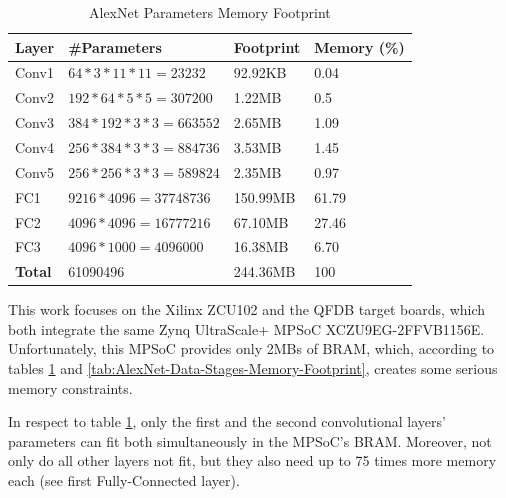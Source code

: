 \begin{table}[H]
	\caption{AlexNet Parameters Memory Footprint}
	\label{tab:AlexNet-Parameters-Memory-Footprint}
	\centering
	\begin{tabular}{llll}
		\toprule
		\textbf{Layer} & \textbf{\#Parameters} & \textbf{Footprint} & \textbf{Memory (\%)}  \\
		\midrule
			Conv1 & $64 * 3 * 11 * 11 = 23232$ & 92.92KB & 0.04 \\
			Conv2 & $192 * 64 * 5 * 5 = 307200$ & 1.22MB & 0.5 \\
			Conv3 & $384 * 192 * 3 * 3 = 663552$ & 2.65MB & 1.09 \\
			Conv4 & $256 * 384 * 3 * 3 = 884736$ & 3.53MB & 1.45 \\
			Conv5 & $256 * 256 * 3 * 3 = 589824$ & 2.35MB & 0.97 \\
			FC1 & $9216 * 4096 = 37748736$ & 150.99MB & 61.79 \\
			FC2 & $4096 * 4096 = 16777216$ & 67.10MB & 27.46 \\
			FC3 & $4096 * 1000 = 4096000$ & 16.38MB & 6.70 \\
		\midrule
			\textbf{Total} & 61090496 & 244.36MB & 100 \\
		\bottomrule
	\end{tabular}
\end{table}

This work focuses on the Xilinx ZCU102 \cite{ZCU102-User-Guide} \cite{ZCU102-Product-Overview} and the QFDB \cite{Implementation-and-Impact-of-an-Ultra-Compact-Multi-FPGA-Board-for-Large-System-Prototyping} target boards, which both integrate the same Zynq UltraScale+ MPSoC XCZU9EG-2FFVB1156E. Unfortunately, this MPSoC provides only 2MBs of BRAM, which, according to tables \ref{tab:AlexNet-Parameters-Memory-Footprint} and \ref{tab:AlexNet-Data-Stages-Memory-Footprint}, creates some serious memory constraints.

In respect to table \ref{tab:AlexNet-Parameters-Memory-Footprint}, only the first and the second convolutional layers' parameters can fit both simultaneously in the MPSoC's BRAM. Moreover, not only do all other layers not fit, but they also need up to 75 times more memory each (see first Fully-Connected layer).

